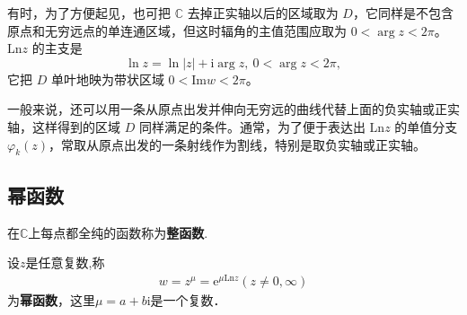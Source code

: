\documentclass[../../main.tex]{subfiles}%
\begin{document}
有时，为了方便起见，也可把 \( \mathbb{C} \) 去掉正实轴以后的区域取为 \( D \)，它同样是不包含原点和无穷远点的单连通区域，但这时辐角的主值范围应取为 \( 0 < \arg z < 2\pi \)。\( \mathrm{Ln} z \) 的主支是
\[
\ln z = \ln|z| + \mathrm{i}\arg z, \ 0 < \arg z < 2\pi,
\]
它把 \( D \) 单叶地映为带状区域 \( 0 < \mathrm{Im} w < 2\pi \)。

一般来说，还可以用一条从原点出发并伸向无穷远的曲线代替上面的负实轴或正实轴，这样得到的区域 \( D \) 同样满足的条件。通常，为了便于表达出 \( \mathrm{Ln} z \) 的单值分支 \( \varphi_k(z) \)，常取从原点出发的一条射线作为割线，特别是取负实轴或正实轴。



\subsection{幂函数}

\begin{definition}[整函数]
在$\mathbb{C}$上每点都全纯的函数称为\textbf{整函数}.
\end{definition}

\begin{definition}[幂函数]
设$z$是任意复数,称
\begin{align*}
w = z^{\mu}= \text{e}^{\mu \mathrm{Ln} z}(z\neq 0,\infty)
\end{align*}
为\textbf{幂函数}，这里$\mu = a + b\text{i}$是一个复数．
\end{definition}
\end{document}
